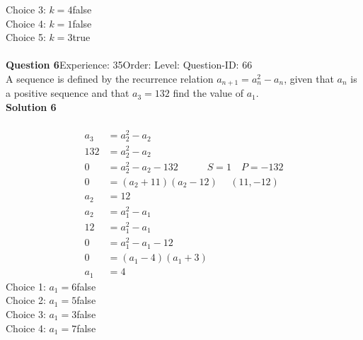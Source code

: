 \documentclass{article}
\begin{document}
Choice 3: \hspace{20pt}$k=4$\hspace{20pt}false\\
Choice 4: \hspace{20pt}$k=1$\hspace{20pt}false\\
Choice 5: \hspace{20pt}$k=3$\hspace{20pt}true\\
\\[4pt]
\noindent\textbf{Question 6}\hspace{20pt}Experience: 35\hspace{20pt}Order: \hspace{20pt}Level: \hspace{20pt}Question-ID: 66\\[2pt]
A sequence is defined by the recurrence relation $a_{n+1}=a_n^2-a_n$, given that $a_n$ is a positive sequence and that $a_3=132$ find the value of $a_1$.\\[4pt]
\noindent\textbf{Solution 6}\\[2pt]
\\[-35pt]\begin{align*}
a_3&=a_2^2-a_2\\[2pt]
132&=a_2^2-a_2\\[2pt]
0&=a_2^2-a_2-132 \hspace{35pt} S=1 \quad P=-132\\[2pt]
0&=(a_2+11)(a_2-12)\hspace{15pt} (11,-12)\\[2pt]
a_2&=12\\[12pt]
a_2&=a_1^2-a_1\\[2pt]
12&=a_1^2-a_1\\[2pt]
0&=a_1^2-a_1-12\\[2pt]
0&=(a_1-4)(a_1+3)\\[2pt]
a_1&=4
\end{align*}
Choice 1: \hspace{20pt}$a_1=6$\hspace{20pt}false\\
Choice 2: \hspace{20pt}$a_1=5$\hspace{20pt}false\\
Choice 3: \hspace{20pt}$a_1=3$\hspace{20pt}false\\
Choice 4: \hspace{20pt}$a_1=7$\hspace{20pt}false\\
\end{document}
